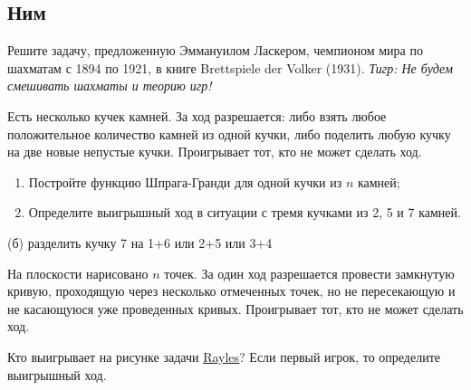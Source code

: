 \subsection{Ним}





\begin{problem}
Решите задачу, предложенную Эммануилом Ласкером, чемпионом мира по шахматам с 1894 по 1921, в книге Brettspiele der Volker (1931). {\it Тигр: Не будем смешивать шахматы и теорию игр!}\par
Есть несколько кучек камней. За ход разрешается: либо взять любое положительное количество камней из одной кучки, либо поделить любую кучку на две новые непустые кучки. Проигрывает тот, кто не может сделать ход.\par
\begin{enumerate}
\item 	Постройте функцию Шпрага-Гранди для одной кучки из  $n$  камней;\par
\item 	Определите выигрышный ход в ситуации с тремя кучками из 2, 5 и 7 камней.\par
\end{enumerate}


\begin{sol}
(б) разделить кучку 7 на 1+6 или 2+5 или 3+4
\end{sol}
\end{problem}

\begin{problem}
На плоскости нарисовано  $n$  точек. За один ход разрешается провести замкнутую кривую, проходящую через несколько отмеченных точек, но не пересекающую и не касающуюся уже проведенных кривых. Проигрывает тот, кто не может сделать ход.\par
Кто выигрывает на рисунке задачи \hyperref[Rayles]{Rayles}? Если первый игрок, то определите выигрышный ход.

\begin{sol}

\end{sol}
\end{problem}



